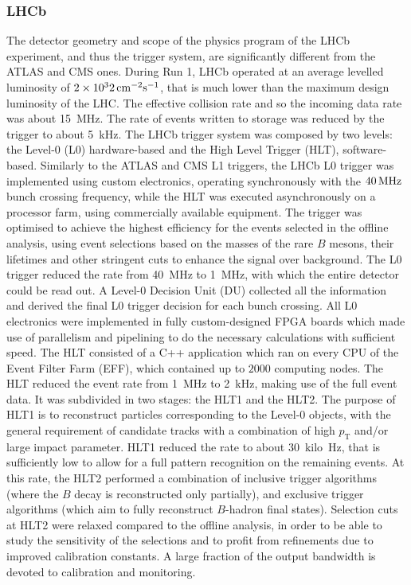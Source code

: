 \subsubsection{LHCb}
The detector geometry and scope of the physics program of the LHCb experiment, and thus the trigger system, are significantly different from the ATLAS and CMS ones.
During Run 1, LHCb operated at an average levelled luminosity of $2\times10^32 \,\rm cm^{-2} s^{-1}$, that is much lower than the maximum design luminosity of the LHC.
The effective collision rate and so the incoming data rate was about \SI{15}{\mega\hertz}. The rate of events written to storage was reduced by the trigger to about \SI{5}{\kilo\hertz}. %
The LHCb trigger system was composed by two levels: the Level-0 (L0) hardware-based and the High Level Trigger (HLT), software-based. Similarly to the ATLAS and CMS L1 triggers, the LHCb L0 trigger was implemented using custom electronics, operating synchronously with the $40 \,\rm MHz$ bunch crossing frequency, while the HLT was executed asynchronously on a processor farm, using commercially available equipment. 
The trigger was optimised to achieve the highest efficiency for the events selected in the offline analysis, using event selections based on the masses of the rare $B$ mesons, their lifetimes and other stringent cuts to enhance the signal over background. The L0 trigger reduced the rate from \SI{40}{\mega\hertz} to \SI{1}{\mega\hertz}, with which the entire detector could be read out. A Level-0 Decision Unit (DU) collected all the information and derived the final L0 trigger decision for each bunch crossing. All L0 electronics were implemented in fully custom-designed FPGA boards which made use of parallelism and pipelining to do the necessary calculations with sufficient speed.
The HLT consisted of a C++ application which ran on every CPU of the Event Filter Farm (EFF), which contained up to $2000$ computing nodes. The HLT reduced the event rate from \SI{1}{\mega\hertz} to \SI{2}{\kilo\hertz}, making use of the full event data. It was subdivided in two stages: the HLT1 and the HLT2. The purpose of HLT1 is to reconstruct
particles corresponding to the Level-0 objects, with the general requirement of candidate tracks with a combination of high $p_\mathrm{T}$ and/or large impact parameter. HLT1 reduced the rate to about \SI{30}{kilo\hertz}, that is sufficiently low to allow for a full pattern recognition on the remaining events. At this rate, the HLT2 performed a combination of inclusive trigger algorithms (where the $B$ decay is reconstructed only partially), and exclusive trigger algorithms (which aim to fully reconstruct $B$-hadron final states). Selection cuts at HLT2 were relaxed compared to the offline analysis, in order to be able to study the sensitivity of the selections and to profit from refinements due to improved calibration constants. A large fraction of the output bandwidth is devoted to calibration and monitoring.

